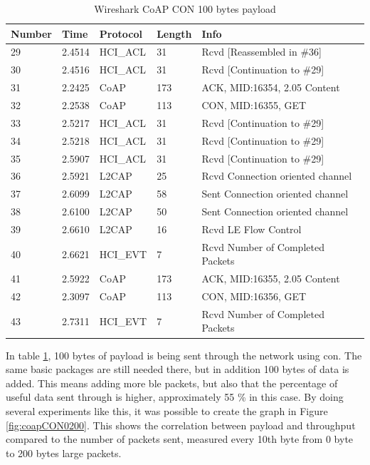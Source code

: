 \begin{table}[H]
\centering
\caption{Wireshark CoAP CON 100 bytes payload}
\label{coapCON100table}
\begin{tabular}{lllll}
Number & Time   & Protocol & Length & Info                             \\ \hline
29     & 2.4514 & HCI\_ACL & 31     & Rcvd {[}Reassembled in \#36{]}   \\
30     & 2.4516 & HCI\_ACL & 31     & Rcvd {[}Continuation to \#29{]}  \\
31     & 2.2425 & CoAP     & 173    & ACK, MID:16354, 2.05 Content     \\
32     & 2.2538 & CoAP     & 113    & CON, MID:16355, GET              \\
33     & 2.5217 & HCI\_ACL & 31     & Rcvd {[}Continuation to \#29{]}  \\
34     & 2.5218 & HCI\_ACL & 31     & Rcvd {[}Continuation to \#29{]}  \\
35     & 2.5907 & HCI\_ACL & 31     & Rcvd {[}Continuation to \#29{]}  \\
36     & 2.5921 & L2CAP    & 25     & Rcvd Connection oriented channel \\
37     & 2.6099 & L2CAP    & 58     & Sent Connection oriented channel \\
38     & 2.6100 & L2CAP    & 50     & Sent Connection oriented channel \\
39     & 2.6610 & L2CAP    & 16     & Rcvd LE Flow Control             \\
40     & 2.6621 & HCI\_EVT & 7      & Rcvd Number of Completed Packets \\
41     & 2.5922 & CoAP     & 173    & ACK, MID:16355, 2.05 Content     \\
42     & 2.3097 & CoAP     & 113    & CON, MID:16356, GET              \\ 
43     & 2.7311 & HCI\_EVT & 7      & Rcvd Number of Completed Packets \\ \hline
\end{tabular}
\end{table}

\noindent In table \ref{coapCON100table}, 100 bytes of \gls{payload} is being sent through the network using \gls{con}. The same basic packages are still needed there, but in addition 100 bytes of data is added. This means adding more \gls{ble} packets, but also that the percentage of useful data sent through is  higher, approximately 55 \%  in this case. By doing several experiments like this, it was possible to create the graph in Figure \ref{fig:coapCON0200}. This shows the correlation between \gls{payload} and \gls{throughput} compared to the number of packets sent, measured every 10th byte from 0 byte to 200 bytes large packets. %


